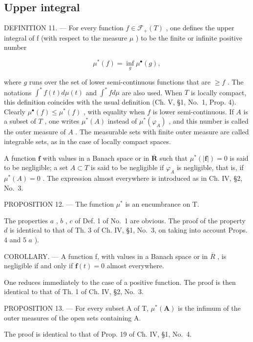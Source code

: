\subsection{Upper integral}

DEFINITION 11. --- For every function \(f \in \mathcal{F}_{+}(T)\) , one defines the upper integral of f (with respect to the measure \(\mu\) ) to be the finite or infinite positive number

\[
\mu^ {*} (f) = \inf _ {g} \mu^ {\bullet} (g),\tag{9}
\]

where \(g\) runs over the set of lower semi-continuous functions that are \(\geqslant f\) . The notations \(\int^{*} f(t) d\mu(t)\) and \(\int^{*} f d\mu\) are also used. When \(T\) is locally compact, this definition coincides with the usual definition (Ch. V, §1, No.~1, Prop. 4). Clearly \(\mu^{\bullet}(f) \leqslant \mu^{*}(f)\) , with equality when \(f\) is lower semi-continuous. If \(A\) is a subset of \(T\) , one writes \(\mu^{*}(A)\) instead of \(\mu^{*}(\varphi_{A})\) , and this number is called the outer measure of \(A\) . The measurable sets with finite outer measure are called integrable sets, as in the case of locally compact spaces.

A function \(\mathbf{f}\) with values in a Banach space or in \(\overline{\mathbf{R}}\) such that \(\mu^{*}(|\mathbf{f}|)=0\) is said to be negligible; a set \(A\subset T\) is said to be negligible if \(\varphi_{A}\) is negligible, that is, if \(\mu^{*}(A)=0\) . The expression almost everywhere is introduced as in Ch. IV, §2, No.~3.

PROPOSITION 12. --- The function \(\mu^{*}\) is an encumbrance on T.

The properties \(a\) , \(b\) , \(c\) of Def. 1 of No.~1 are obvious. The proof of the property \(d\) is identical to that of Th. 3 of Ch. IV, §1, No.~3, on taking into account Props. 4 and 5 \(a\) ).

COROLLARY. --- A function f, with values in a Banach space or in \(\overline{R}\) , is negligible if and only if \(\mathbf{f}(t)=0\) almost everywhere.

One reduces immediately to the case of a positive function. The proof is then identical to that of Th. 1 of Ch. IV, §2, No.~3.

PROPOSITION 13. --- For every subset A of T, \(\mu^{*}(\mathbf{A})\) is the infimum of the outer measures of the open sets containing A.

The proof is identical to that of Prop. 19 of Ch. IV, §1, No.~4.

